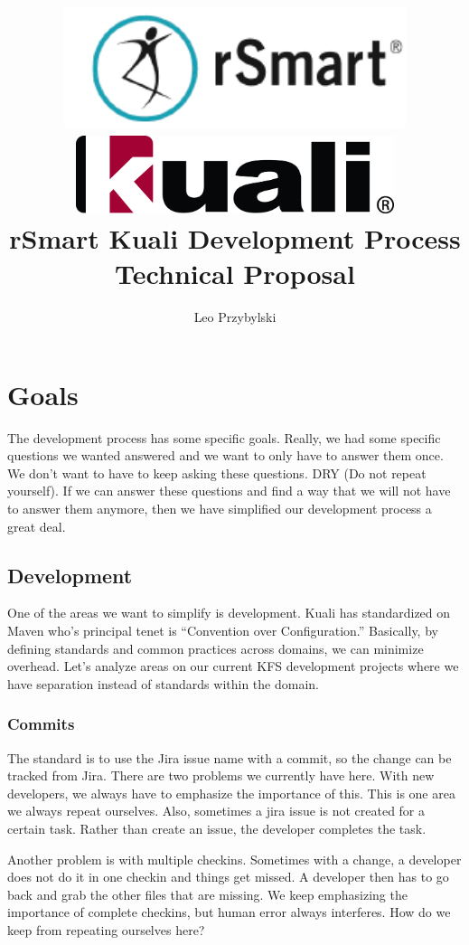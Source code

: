 \documentclass[12pt,notitlepage]{article}
\author{Leo Przybylski}
\title{\includegraphics[width=0.75\textwidth]{../images/rsmart_base.png}\\\includegraphics[width=0.70\textwidth]{../images/kuali_base.png}\\rSmart
Kuali Development Process Technical Proposal}
\begin{document}
\maketitle
\tableofcontents


\section{Goals}

The development process has some specific goals. Really, we had some
specific questions we wanted answered and we want to only have to
answer them once. We don't want to have to keep asking these
questions. DRY (Do not repeat yourself). If we can answer these questions and find a way that we
will not have to answer them anymore, then we have simplified our
development process a great deal.

\subsection{Development}

One of the areas we want to simplify is development. Kuali has
standardized on Maven who's principal tenet is ``Convention over
Configuration.'' Basically, by defining standards and common practices
across domains, we can minimize overhead. Let's analyze areas on our
current KFS development projects where we have separation instead of
standards within the domain.

\subsubsection{Commits}
The standard is to use the Jira issue name with a commit, so the
change can be tracked from Jira. There are two problems we currently
have here. With new developers, we always have to emphasize the
importance of this. This is one area we always repeat ourselves. Also,
sometimes a jira issue is not created for a certain task. Rather than
create an issue, the developer completes the task.

Another problem is with multiple checkins. Sometimes with a change, a
developer does not do it in one checkin and things get missed. A
developer then has to go back and grab the other files that are
missing. We keep emphasizing the importance of complete checkins, but
human error always interferes. How do we keep from repeating ourselves
here?
\end{document}
